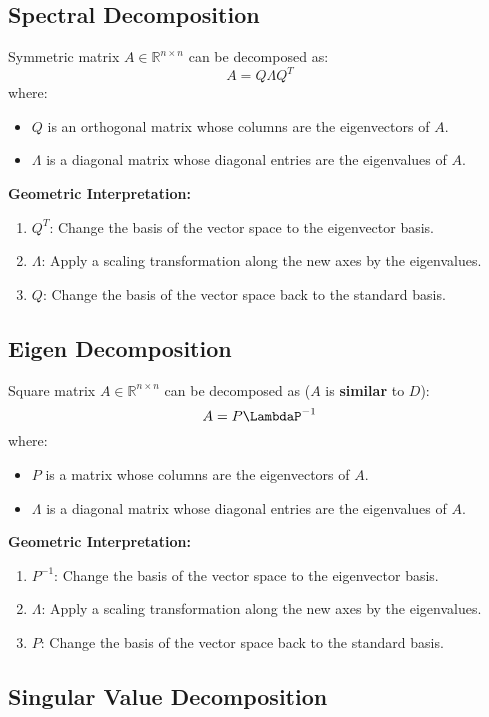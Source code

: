 \documentclass{article}
\begin{document}
\subsection{Spectral Decomposition}

Symmetric matrix $A \in \mathbb{R}^{n \times n}$ can be decomposed as:
\[
    A = Q \Lambda Q^T
\]
where:
\begin{itemize}
    \item $Q$ is an orthogonal matrix whose columns are the eigenvectors of $A$.
    \item $\Lambda$ is a diagonal matrix whose diagonal entries are the eigenvalues of $A$.
\end{itemize}
\textbf{Geometric Interpretation:}
\begin{enumerate}
    \item $Q^T$: Change the basis of the vector space to the eigenvector basis.
    \item $\Lambda$: Apply a scaling transformation along the new axes by the eigenvalues.
    \item $Q$: Change the basis of the vector space back to the standard basis.
\end{enumerate}

\subsection{Eigen Decomposition}

Square matrix $A \in \mathbb{R}^{n \times n}$ can be decomposed as ($A$ is \textbf{similar} to $D$):
\[
    A = P \LambdaP ^{-1}
\]
where:
\begin{itemize}
    \item $P$ is a matrix whose columns are the eigenvectors of $A$.
    \item $\Lambda$ is a diagonal matrix whose diagonal entries are the eigenvalues of $A$.
\end{itemize}
\textbf{Geometric Interpretation:}
\begin{enumerate}
    \item $P^{-1}$: Change the basis of the vector space to the eigenvector basis.
    \item $\Lambda$: Apply a scaling transformation along the new axes by the eigenvalues.
    \item $P$: Change the basis of the vector space back to the standard basis.
\end{enumerate}

\subsection{Singular Value Decomposition}
\end{document}
